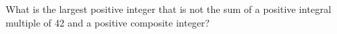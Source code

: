 What is the largest positive integer that is not the sum of a positive integral multiple of 42 and a positive composite integer?